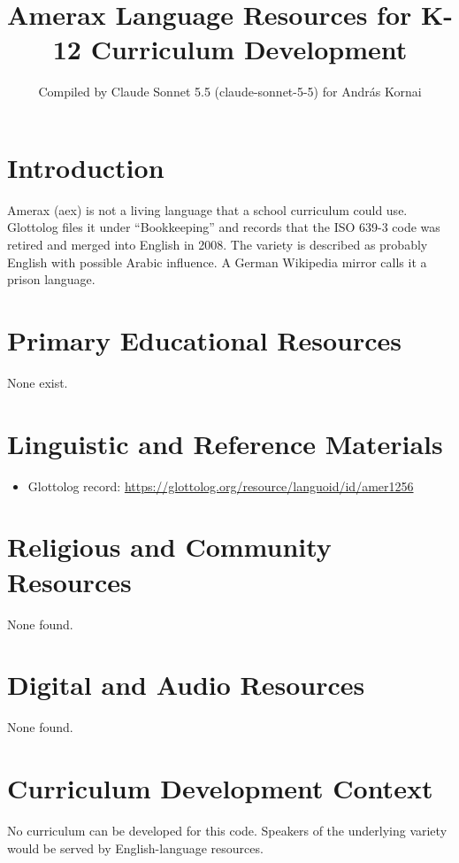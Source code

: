 \documentclass[12pt]{article}
\title{Amerax Language Resources for K-12 Curriculum Development}
\author{Compiled by Claude Sonnet 5.5 (claude-sonnet-5-5) for Andr\'as Kornai}
\date{}
\begin{document}
\maketitle

\section{Introduction}
Amerax (aex) is not a living language that a school curriculum could use. Glottolog files it under ``Bookkeeping'' and records that the ISO 639-3 code was retired and merged into English in 2008. The variety is described as probably English with possible Arabic influence. A German Wikipedia mirror calls it a prison language.

\section{Primary Educational Resources}
None exist.

\section{Linguistic and Reference Materials}
\begin{itemize}
\item Glottolog record: \url{https://glottolog.org/resource/languoid/id/amer1256}
\end{itemize}

\section{Religious and Community Resources}
None found.

\section{Digital and Audio Resources}
None found.

\section{Curriculum Development Context}
No curriculum can be developed for this code. Speakers of the underlying variety would be served by English-language resources.
\end{document}
